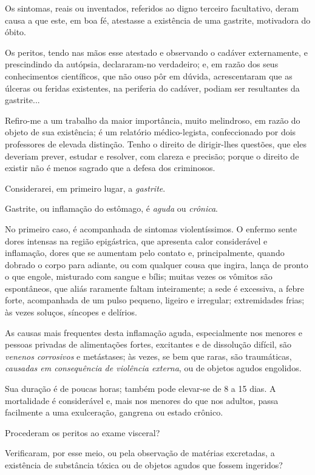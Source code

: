 Os sintomas, reais ou inventados, referidos ao digno terceiro
facultativo, deram causa a que este, em boa fé, atestasse a existência
de uma gastrite, motivadora do óbito.

Os peritos, tendo nas mãos esse atestado e observando o cadáver
externamente, e prescindindo da autópsia, declararam-no verdadeiro; e,
em razão dos seus conhecimentos científicos, que não ouso pôr em dúvida,
acrescentaram que as úlceras ou feridas existentes, na periferia do
cadáver, podiam ser resultantes da gastrite...

Refiro-me a um trabalho da maior importância, muito melindroso, em razão
do objeto de sua existência; é um relatório médico-legista,
confeccionado por dois professores de elevada distinção. Tenho o direito
de dirigir-lhes questões, que eles deveriam prever, estudar e resolver,
com clareza e precisão; porque o direito de existir não é menos sagrado
que a defesa dos criminosos.

Considerarei, em primeiro lugar, a \emph{gastrite}.

Gastrite, ou inflamação do estômago, é \emph{aguda} ou \emph{crônica}.

No primeiro caso, é acompanhada de sintomas violentíssimos. O enfermo
sente dores intensas na região epigástrica, que apresenta calor
considerável e inflamação, dores que se aumentam pelo contato e,
principalmente, quando dobrado o corpo para adiante, ou com qualquer
cousa que ingira, lança de pronto o que engole, misturado com sangue e
bílis; muitas vezes os vômitos são espontâneos, que aliás raramente
faltam inteiramente; a sede é excessiva, a febre forte, acompanhada de
um pulso pequeno, ligeiro e irregular; extremidades frias; às vezes
soluços, síncopes e delírios.

As causas mais frequentes desta inflamação aguda, especialmente nos
menores e pessoas privadas de alimentações fortes, excitantes e de
dissolução difícil, são \emph{venenos corrosivos} e metástases; às
vezes, se bem que raras, são traumáticas, \emph{causadas em consequência
de violência externa}, ou de objetos agudos engolidos.

Sua duração é de poucas horas; também pode elevar-se de 8 a 15 dias. A
mortalidade é considerável e, mais nos menores do que nos adultos, passa
facilmente a uma exulceração, gangrena ou estado crônico.

Procederam os peritos ao exame visceral?

Verificaram, por esse meio, ou pela observação de matérias excretadas, a
existência de substância tóxica ou de objetos agudos que fossem
ingeridos?


